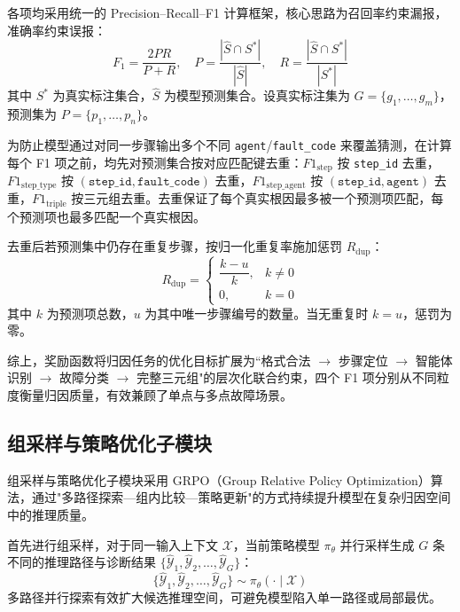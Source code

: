 各项均采用统一的 Precision--Recall--F1 计算框架，核心思路为召回率约束漏报，准确率约束误报：
\begin{equation}
  F_1 = \frac{2PR}{P+R}, \quad
  P = \frac{|\hat{S} \cap S^*|}{|\hat{S}|}, \quad
  R = \frac{|\hat{S} \cap S^*|}{|S^*|}
\end{equation}
其中 $S^*$ 为真实标注集合，$\hat{S}$ 为模型预测集合。设真实标注集为 $G = \{g_1,\ldots,g_m\}$，预测集为 $P = \{p_1,\ldots,p_n\}$。

 
为防止模型通过对同一步骤输出多个不同 \texttt{agent}/\texttt{fault\_code} 来覆盖猜测，在计算每个 F1 项之前，均先对预测集合按对应匹配键去重：$F1_{\text{step}}$ 按 \texttt{step\_id} 去重，$F1_{\text{step\_type}}$ 按 $(\texttt{step\_id}, \texttt{fault\_code})$ 去重，$F1_{\text{step\_agent}}$ 按 $(\texttt{step\_id}, \texttt{agent})$ 去重，$F1_{\text{triple}}$ 按三元组去重。去重保证了每个真实根因最多被一个预测项匹配，每个预测项也最多匹配一个真实根因。
 
去重后若预测集中仍存在重复步骤，按归一化重复率施加惩罚 $R_{\text{dup}}$：
\begin{equation}
  R_{\text{dup}} = \begin{cases}
    \dfrac{k - u}{k}, & k \neq 0 \\[4pt]
    0, & k = 0
  \end{cases}
\end{equation}
其中 $k$ 为预测项总数，$u$ 为其中唯一步骤编号的数量。当无重复时 $k=u$，惩罚为零。
 
综上，奖励函数将归因任务的优化目标扩展为“格式合法 $\to$ 步骤定位 $\to$ 智能体识别 $\to$ 故障分类 $\to$ 完整三元组"的层次化联合约束，四个 F1 项分别从不同粒度衡量归因质量，有效兼顾了单点与多点故障场景。
 
\subsection{组采样与策略优化子模块}
组采样与策略优化子模块采用 GRPO（Group Relative Policy Optimization）\cite{DBLP:journals/corr/abs-2402-03300}算法，通过"多路径探索—组内比较—策略更新"的方式持续提升模型在复杂归因空间中的推理质量。
 
首先进行组采样，对于同一输入上下文 $\mathcal{X}$，当前策略模型 $\pi_\theta$ 并行采样生成 $G$ 条不同的推理路径与诊断结果 $ \{\hat{\mathcal{Y}}_1, \hat{\mathcal{Y}}_2, \ldots, \hat{\mathcal{Y}}_G\}$：
\begin{equation}
  \{\hat{\mathcal{Y}}_1, \hat{\mathcal{Y}}_2, \ldots, \hat{\mathcal{Y}}_G\} \sim \pi_\theta(\cdot \mid \mathcal{X})
\end{equation}
多路径并行探索有效扩大候选推理空间，可避免模型陷入单一路径或局部最优。
  
